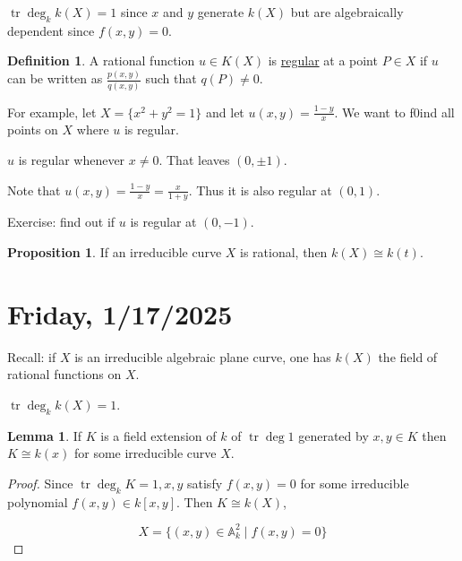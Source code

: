 \documentclass{article}
\theoremstyle{definition}
\newtheorem*{definition}{Definition}
\newtheorem{proposition}[theorem]{Proposition}
\newtheorem{lemma}[theorem]{Lemma}
\begin{document}
    \(\operatorname{tr} \deg_k k(X) = 1\) since \(x\) and \(y\) generate \(k(X)\) but are algebraically dependent since \(f(x,y)=0\).  
    
    \begin{definition}
        A rational function \(u\in K(X)\)  is \underline{regular} at a point \(P\in X\) if \(u\) can be written as \(\frac{p(x,y)}{q(x,y)}\) such that \(q(P) \neq 0\).
    \end{definition}

    For example, let \(X = \{ x^2 + y^2 = 1 \}\) and let \(u(x,y) = \frac{1-y}{x}\). We want to f0ind all points on \(X\) where \(u\) is regular.

    \(u\) is regular whenever \(x\neq 0\). That leaves \((0,\pm 1)\).

    Note that \(u(x,y) = \frac{1-y}{x} = \frac{x}{1+y}\). Thus it is also regular at \((0,1)\).

    Exercise: find out if \(u\) is regular at \((0,-1)\).

    \begin{proposition}
        If an irreducible curve \(X\) is rational, then \(k(X) \cong k(t)\).
    \end{proposition}

    \section*{Friday, 1/17/2025}
    
        Recall: if \(X\) is an irreducible algebraic plane curve, one has \(k(X)\) the field of rational functions on \(X\).

        \(\operatorname{tr} \deg_k k(X) = 1\).
        
        \begin{lemma}
            If \(K\) is a field extension of \(k\) of \(\operatorname{tr} \deg 1\) generated by \(x,y\in K\) then \(K \cong k(x)\) for some irreducible curve \(X\).
        \end{lemma}

        \begin{proof}
            Since \(\operatorname{tr} \deg_k K = 1, x,y\) satisfy \(f(x,y) = 0\) for some irreducible polynomial \(f(x,y)\in k[x,y]\). Then \(K \cong k(X)\),

            \[
                X = \{ (x,y)\in \mathbb{A}_k^2 \mid f(x,y) = 0 \}
            \]

        \end{proof}
\end{document}

